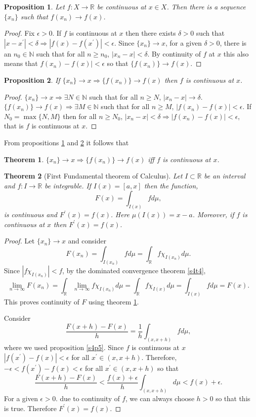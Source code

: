 \documentclass{article}
\newcommand{\sor}{\mathbb{R}}
\newcommand{\son}{\mathbb{N}}
\newcommand{\op}{\prime}
\theoremstyle{plain}
\newtheorem{thm}{Theorem}
\numberwithin{thm}{section}
\theoremstyle{plain}
\newtheorem{prop}{Proposition}
\numberwithin{prop}{section}
\theoremstyle{definition}
\numberwithin{defn}{section}
\theoremstyle{remark}
\theoremstyle{plain}
\numberwithin{cor}{section}
\numberwithin{equation}{section}
\begin{document}
\begin{prop}\label{s4p7}
Let $f: X \rightarrow \sor$ be continuous at $x \in X$. Then there is a sequence
$\{x_n\}$ such that $f(x_n) \rightarrow f(x)$.
\end{prop}
\begin{proof}
Fix $\epsilon > 0$. If $f$ is continuous at $x$ then there exists $\delta > 0$
such that $|x - x^\op| < \delta \Rightarrow |f(x) - f(x^\op)| < \epsilon$. Since
$\{x_n\} \rightarrow x$, for a given $\delta > 0$, there is an $n_0 \in \son$ 
such that for all $n \ge n_0$, $|x_n - x| < \delta$. By continuity of $f$ at $x$
this also means that $f(x_n) - f(x)| < \epsilon$ so that $\{f(x_n)\} \rightarrow
f(x)$.
\end{proof}

\begin{prop}\label{s4p8}
If $\{x_n\} \rightarrow x \Rightarrow \{f(x_n)\} \rightarrow f(x)$ then $f$ is 
continuous at $x$.
\end{prop}
\begin{proof}
$\{x_n\} \rightarrow x \Rightarrow \exists N \in \son$ such that for all $n \ge
N$, $|x_n - x| \rightarrow \delta$. $\{f(x_n)\} \rightarrow f(x) \Rightarrow 
\exists M \in \son$ such that for all $n \ge M$, $|f(x_n) - f(x)| < \epsilon$.
If $N_0 = \max\{N, M\}$ then for all $n \ge N_0$, $|x_n - x| < \delta 
\Rightarrow |f(x_n) - f(x)| < \epsilon$, that is $f$ is continuous at $x$.
\end{proof}

From propositions \ref{s4p7} and \ref{s4p8} it follows that
\begin{thm}\label{s4t8}
$\{x_n\} \rightarrow x \Rightarrow \{f(x_n)\} \rightarrow f(x)$ iff $f$ is 
continuous at $x$.
\end{thm}

\begin{thm}[First Fundamental theorem of Calculus]\label{s4t9} Let $I \subset 
\sor$ be an interval and $f: I \rightarrow \sor$ be integrable. If $I(x) = 
[a, x]$ then the function,
\[
F(x) = \int_{I(x)} fd\mu,
\]
is continuous and $F^\prime(x) = f(x)$. Here $\mu(I(x)) = x - a$. Moreover, if
$f$ is continuous at $x$ then $F^\op(x) = f(x)$.
\end{thm}
\begin{proof}
Let $\{x_n\} \rightarrow x$ and consider
\[
F(x_n) = \int_{I(x_n)}fd\mu = \int_\sor f\chi_{I(x_n)}d\mu.
\]
Since $|f\chi_{I(x_n)}| < f$, by the dominated convergence theorem \ref{s4t4},
\[
\lim_{n \rightarrow \infty}F(x_n) = \int_\sor\lim_{n \rightarrow \infty}
f\chi_{I(x_n)}d\mu = \int_\sor f\chi_{I(x)} d\mu = \int_{I(x)}fd\mu = F(x).
\]
This proves continuity of $F$ using theorem \ref{s4t8}.

Consider 
\[
\frac{F(x+h) - F(x)}{h} = \frac{1}{h}\int_{(x, x+h)}f d\mu,
\]
where we used proposition \ref{s4p5}. Since $f$ is continuous at $x$
$|f(x^\op) - f(x)| < \epsilon$ for all $x^\op \in (x, x + h)$. Therefore,
$-\epsilon < f(x^\op) - f(x) < \epsilon$ for all $x^\op \in (x, x+h)$ so that
\[
\frac{F(x+h) - F(x)}{h} < \frac{f(x) + \epsilon}{h}\int_{(x, x+h)} d\mu < f(x)
+ \epsilon.
\]
For a given $\epsilon > 0$. due to continuity of $f$, we can always choose $h>0$
so that this is true. Therefore $F^\op(x) = f(x)$.
\end{proof}
\end{document}
